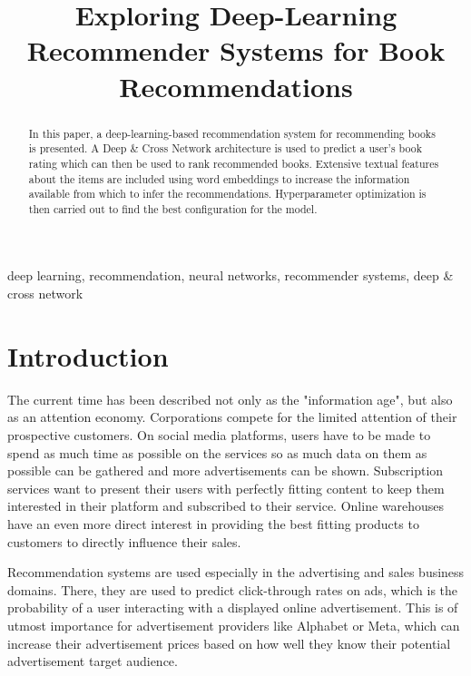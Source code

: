 \documentclass[10pt,final,journal,a4paper,oneside,twocolumn]{IEEEtran}
\begin{document}
\title{Exploring Deep-Learning Recommender Systems for Book Recommendations}

\author{
}

\maketitle

\begin{abstract}
In this paper, a deep-learning-based recommendation system for recommending books is presented. A Deep \& Cross Network architecture is used to predict a user's book rating which can then be used to rank recommended books. Extensive textual features about the items are included using word embeddings to increase the information available from which to infer the recommendations. Hyperparameter optimization is then carried out to find the best configuration for the model.
\end{abstract}

\begin{IEEEkeywords}
deep learning, recommendation, neural networks, recommender systems, deep \& cross network
\end{IEEEkeywords}

\section{Introduction}
The current time has been described not only as the "information age", but also as an attention economy. Corporations compete for the limited attention of their prospective customers. On social media platforms, users have to be made to spend as much time as possible on the services so as much data on them as possible can be gathered and more advertisements can be shown. Subscription services want to present their users with perfectly fitting content to keep them interested in their platform and subscribed to their service. Online warehouses have an even more direct interest in providing the best fitting products to customers to directly influence their sales.

Recommendation systems are used especially in the advertising and sales business domains. There, they are used to predict click-through rates on ads, which is the probability of a user interacting with a displayed online advertisement. This is of utmost importance for advertisement providers like Alphabet or Meta, which can increase their advertisement prices based on how well they know their potential advertisement target audience. 
\end{document}
